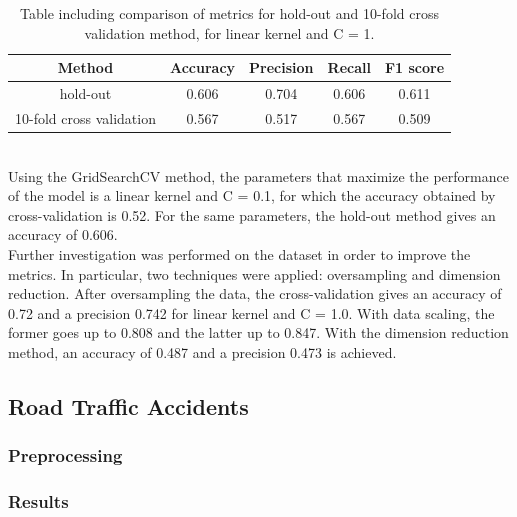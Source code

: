 \documentclass{article}
\begin{document}
\begin{table}[h!]
\centering
\begin{tabular}{||c c c c c||} 
 \hline
Method &  Accuracy & Precision & Recall & F1 score \\ [0.5ex] 
 \hline\hline
hold-out & 0.606 & 0.704 & 0.606 & 0.611  \\  
 10-fold cross validation &  0.567&  0.517 & 0.567& 0.509 \\ [1ex] 
 \hline
\end{tabular}
\caption{Table including comparison of metrics for hold-out and 10-fold cross validation method, for linear kernel and C = 1.}
\label{table:reviews_SVM_cross}
\end{table}
\\
Using the GridSearchCV method, the parameters that maximize the performance of the model is a linear kernel and C = 0.1, for which the accuracy obtained by cross-validation is 0.52. For the same parameters, the hold-out method gives an accuracy of 0.606.
\\
Further investigation was performed on the dataset in order to improve the metrics. In particular, two techniques were applied: oversampling and dimension reduction. After oversampling the data, the cross-validation gives an accuracy of 0.72 and a precision 0.742 for linear kernel and C = 1.0. With data scaling, the former goes up to 0.808 and the latter up to 0.847. With the dimension reduction method, an accuracy of 0.487 and a precision 0.473 is achieved. 

\subsection{Road Traffic Accidents}
\subsubsection{Preprocessing}
\subsubsection{Results}
\end{document}
